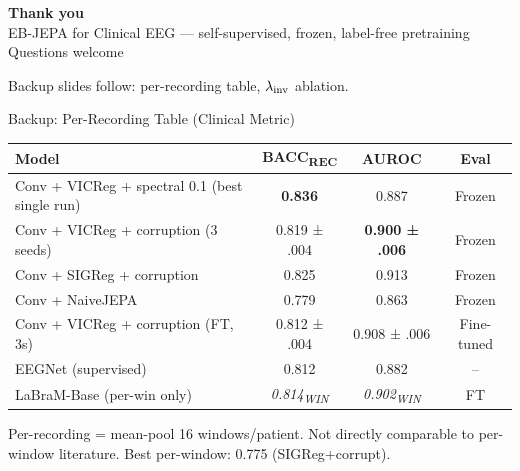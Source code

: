 \documentclass[aspectratio=169,10pt]{beamer}
\begin{document}
\begin{frame}{}
\vspace{1.5em}
\begin{center}
{\Huge\bfseries Thank you}\\[1em]
{\large\textcolor{muted}{EB-JEPA for Clinical EEG --- self-supervised, frozen, label-free pretraining}}\\[1.5em]
{\large Questions welcome}
\end{center}
\vspace{1em}
\begin{center}
\end{center}
\vspace{1em}
\begin{center}\textcolor{muted}{\footnotesize Backup slides follow: per-recording table, $\lambda_{\rm inv}$ ablation.}\end{center}
\end{frame}

\begin{frame}{Backup: Per-Recording Table (Clinical Metric)}
\small
\begin{tabular}{lccc}
\toprule
Model & BACC\textsubscript{REC} & AUROC & Eval \\
\midrule
Conv + VICReg + spectral 0.1 (best single run) & \textbf{0.836} & 0.887 & Frozen \\
Conv + VICReg + corruption (3 seeds) & 0.819 ± .004 & \textbf{0.900 ± .006} & Frozen \\
Conv + SIGReg + corruption           & 0.825 & 0.913 & Frozen \\
Conv + NaiveJEPA                     & 0.779 & 0.863 & Frozen \\
Conv + VICReg + corruption (FT, 3s)  & 0.812 ± .004 & 0.908 ± .006 & Fine-tuned \\
EEGNet (supervised)                  & 0.812 & 0.882 & -- \\
\midrule
LaBraM-Base (per-win only) & \textit{0.814\textsubscript{WIN}} & \textit{0.902\textsubscript{WIN}} & FT \\
\bottomrule
\end{tabular}

\vspace{0.4em}
\textcolor{muted}{\footnotesize Per-recording = mean-pool 16 windows/patient.
Not directly comparable to per-window literature. Best per-window: 0.775 (SIGReg+corrupt).}
\end{frame}
\end{document}
